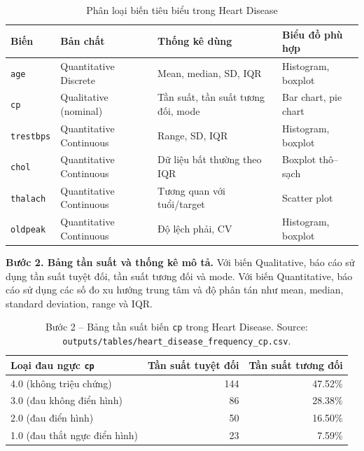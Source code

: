 \begin{table}[H]
\centering
\caption{Phân loại biến tiêu biểu trong Heart Disease}
\label{tab:ch4_heart_variable_types}
\small
\begin{tabularx}{\textwidth}{p{}p{}p{}Y}
\toprule
Biến & Bản chất & Thống kê dùng & Biểu đồ phù hợp \\
\midrule
\texttt{age} & Quantitative Discrete & Mean, median, SD, IQR & Histogram, boxplot \\
\texttt{cp} & Qualitative (nominal) & Tần suất, tần suất tương đối, mode & Bar chart, pie chart \\
\texttt{trestbps} & Quantitative Continuous & Range, SD, IQR & Histogram, boxplot \\
\texttt{chol} & Quantitative Continuous & Dữ liệu bất thường theo IQR & Boxplot thô--sạch \\
\texttt{thalach} & Quantitative Continuous & Tương quan với tuổi/target & Scatter plot \\
\texttt{oldpeak} & Quantitative Continuous & Độ lệch phải, CV & Histogram, boxplot \\
\bottomrule
\end{tabularx}
\end{table}

\textbf{Bước 2. Bảng tần suất và thống kê mô tả.} Với biến Qualitative, báo cáo sử dụng tần suất tuyệt đối, tần suất tương đối và mode. Với biến Quantitative, báo cáo sử dụng các số đo xu hướng trung tâm và độ phân tán như mean, median, standard deviation, range và IQR.

\begin{table}[H]
\centering
\caption[Bảng tần suất biến \texttt{cp} trong Heart Disease]{Bước 2 -- Bảng tần suất biến \texttt{cp} trong Heart Disease. Source: \texttt{outputs/tables/heart\_disease\_frequency\_cp.csv}.}
\label{tab:ch4_cp_frequency}
\small
\begin{tabular}{lrr}
\toprule
Loại đau ngực \texttt{cp} & Tần suất tuyệt đối & Tần suất tương đối \\
\midrule
4.0 (không triệu chứng) & 144 & 47.52\% \\
3.0 (đau không điển hình) & 86 & 28.38\% \\
2.0 (đau điển hình) & 50 & 16.50\% \\
1.0 (đau thắt ngực điển hình) & 23 & 7.59\% \\
\bottomrule
\end{tabular}
\end{table}

